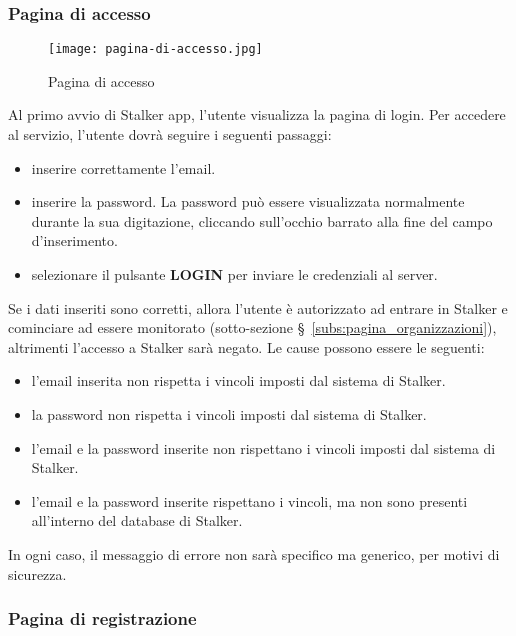\documentclass[../manuale-utente.tex]{subfiles}
\begin{document}
\subsubsection{Pagina di accesso}%
\label{subs:pagina_di_accesso}

\begin{figure}[H]
    \centering
    \texttt{[image: pagina-di-accesso.jpg]}
    \caption{Pagina di accesso}%
    \label{fig:mobile_app_pagina_di_accesso}
\end{figure}
Al primo avvio di Stalker app, l'utente visualizza la pagina di login.
Per accedere al servizio, l'utente dovrà seguire i seguenti passaggi:
\begin{itemize}
    \item inserire correttamente l'email.
    \item inserire la password. La password può essere visualizzata normalmente durante la sua digitazione, cliccando sull'occhio barrato alla fine del campo d'inserimento.
    \item selezionare il pulsante \textbf{LOGIN} per inviare le credenziali al server.
\end{itemize}
Se i dati inseriti sono corretti, allora l'utente è autorizzato ad entrare in Stalker e cominciare ad essere monitorato (sotto-sezione §~\ref{subs:pagina_organizzazioni}), altrimenti l'accesso a Stalker sarà negato.
Le cause possono essere le seguenti:
\begin{itemize}
    \item l'email inserita non rispetta i vincoli imposti dal sistema di Stalker.
    \item la password non rispetta i vincoli imposti dal sistema di Stalker.
    \item l'email e la password inserite non rispettano i vincoli imposti dal sistema di Stalker.
    \item l'email e la password inserite rispettano i vincoli, ma non sono presenti all'interno del database di Stalker.
\end{itemize}
In ogni caso, il messaggio di errore non sarà specifico ma generico, per motivi di sicurezza.

\subsubsection{Pagina di registrazione}%
\label{subs:pagina_di_registrazione}
\end{document}

